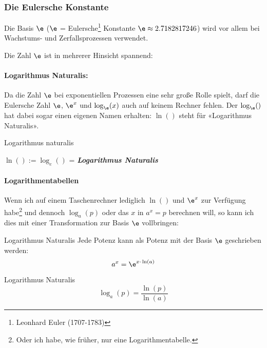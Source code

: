 \newpage


\subsubsection{Die Eulersche Konstante}

Die Basis $\e$ ($\e$ = Eulersche\footnote{Leonhard Euler (1707-1783)} Konstante $\e\approx 2.7182817246$) wird vor allem bei Wachstums- und Zerfallsprozessen verwendet.

Die Zahl $\e$ ist in mehrerer Hinsicht spannend:

\paragraph{Logarithmus Naturalis:} Da die
Zahl $\e$ bei exponentiellen Prozessen eine sehr große Rolle spielt,
darf die Eulersche Zahl $\e$, $\e^x$ und $\log_{\e}(x)$ auch auf keinem Rechner fehlen. Der $\log_{\e}()$ hat dabei sogar einen eigenen Namen erhalten:
$\ln()$ steht für «Logarithmus Naturalis».

\begin{definition}{Logarithmus naturalis}{}
  
  $\ln() := \log_{e}()$ = \textit{\textbf{Logarithmus Naturalis}}
\end{definition}

\paragraph{Logarithmentabellen}
Wenn ich auf einem Taschenrechner lediglich $\ln()$ und $\e^x$ zur
Verfügung habe\footnote{Oder ich habe, wie früher, nur eine
Logarithmentabelle.} und dennoch $\log_a(p)$ oder das $x$ in $a^x=p$ berechnen will, so kann ich dies mit einer Transformation zur Basis $\e$ vollbringen:

\begin{bemerkung}{Logarithmus Naturalis}{}
  Jede Potenz kann als Potenz mit der Basis $\e$ geschrieben werden:
  $$a^x = \e^{x\cdot{}\ln(a)}$$
\end{bemerkung}

\begin{gesetz}{Logarithmus Naturalis}{}
  $$\log_a(p) = \frac{\ln(p)}{\ln(a)}$$
\end{gesetz}

\newpage



